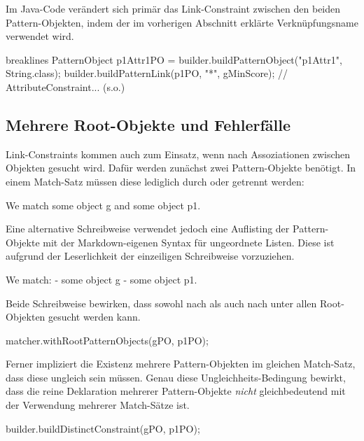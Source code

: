Im Java-Code verändert sich primär das Link-Constraint zwischen den beiden Pattern-Objekten,
indem der im vorherigen Abschnitt erklärte Verknüpfungsname \code{*} verwendet wird.

\begin{jcodeblock*}{breaklines}
    PatternObject p1Attr1PO = builder.buildPatternObject("p1Attr1", String.class);
    builder.buildPatternLink(p1PO, "*", gMinScore);
    // AttributeConstraint... (s.o.)
\end{jcodeblock*}

\subsection{Mehrere Root-Objekte und Fehlerfälle}

Link-Constraints kommen auch zum Einsatz, wenn nach Assoziationen zwischen Objekten gesucht wird.
Dafür werden zunächst zwei Pattern-Objekte benötigt.
In einem Match-Satz müssen diese lediglich durch  oder \code{,} getrennt werden:

\begin{mdcodeblock}
    We match some object g and some object p1.
\end{mdcodeblock}

Eine alternative Schreibweise verwendet jedoch eine Auflisting der Pattern-Objekte mit der Markdown-eigenen Syntax für ungeordnete Listen.
Diese ist aufgrund der Leserlichkeit der einzeiligen Schreibweise vorzuziehen.

\begin{mdcodeblock}
    We match:
    - some object g
    - some object p1.
\end{mdcodeblock}

Beide Schreibweise bewirken, dass sowohl nach  als auch nach  unter allen Root-Objekten gesucht werden kann.

\begin{jcodeblock}
    matcher.withRootPatternObjects(gPO, p1PO);
\end{jcodeblock}

Ferner impliziert die Existenz mehrere Pattern-Objekten im gleichen Match-Satz, dass diese ungleich sein müssen.
Genau diese Ungleichheits-Bedingung bewirkt, dass die reine Deklaration mehrerer Pattern-Objekte \emph{nicht} gleichbedeutend mit der Verwendung mehrerer Match-Sätze ist.

\begin{jcodeblock}
    builder.buildDistinctConstraint(gPO, p1PO);
\end{jcodeblock}

